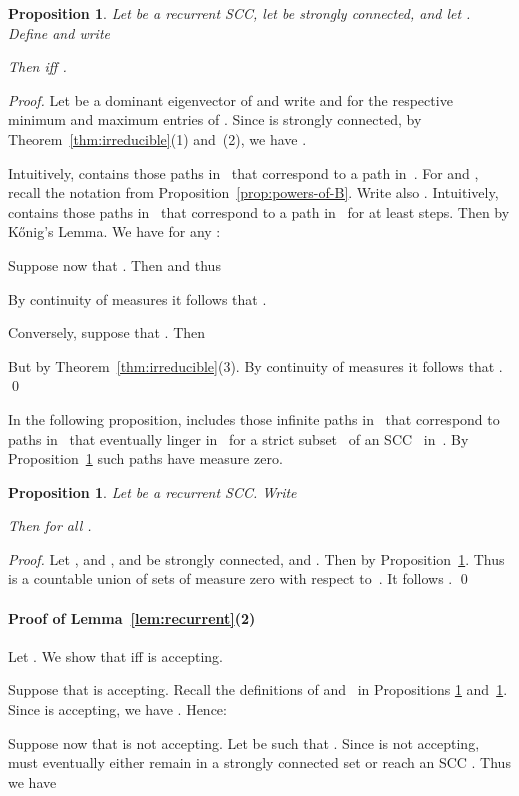 \documentclass{elsarticle}
\newtheorem{proposition}[definition]{Proposition}
\begin{document}
\begin{proposition}
  Let  be a recurrent SCC, let  be strongly
  connected, and let .  Define  and
  write

Then  iff .
\label{prop:recurrent}
\end{proposition}
\begin{proof}
Let  be a dominant eigenvector of  and write
 and  for the
respective minimum and maximum entries of .  Since 
is strongly connected, by Theorem~\ref{thm:irreducible}(1) and~(2), we have .

Intuitively,  contains those paths in~ that correspond to a path in~.
For  and , recall the notation   from Proposition~\ref{prop:powers-of-B}.
Write also .
Intuitively,  contains those paths in~ that correspond to a path in~ for at least  steps.
Then  by K\H{o}nig's Lemma.
We have for any :


  Suppose now that . Then  and thus

By continuity of measures it follows that .

Conversely, suppose that .  Then

But  by Theorem~\ref{thm:irreducible}(3).
By continuity of measures it follows that .  \qed
\end{proof}

In the following proposition,  includes those infinite paths in~ that correspond to paths in~ that eventually linger in~ for a strict subset~ of an SCC~ in~.
By Proposition~\ref{prop:recurrent} such paths have measure zero.
\begin{proposition}
Let  be a recurrent SCC.
Write

Then  for all .
\label{prop:recurrent-2}
\end{proposition}
\begin{proof}
Let , and , and  be strongly connected, and .
Then  by Proposition~\ref{prop:recurrent}.
Thus  is a countable union of sets of measure zero with respect to~.
It follows .
\qed
\end{proof}


\paragraph{Proof of Lemma~\ref{lem:recurrent}(2)}
Let .
We show that  iff  is accepting.

Suppose that  is accepting.
Recall the definitions of  and~ in Propositions \ref{prop:recurrent} and~\ref{prop:recurrent-2}.
Since  is accepting, we have .
Hence:


Suppose now that  is not accepting.  Let 
be such that .  Since  is not accepting,
 must eventually either remain in a strongly connected set  or reach an SCC .  Thus we have
\end{document}
